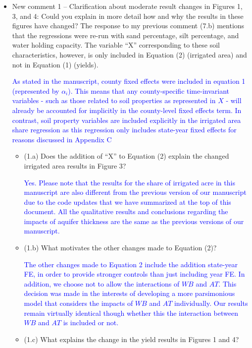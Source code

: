\documentclass[
]{article}
\begin{document}
\begin{itemize}
\item New comment 1 – Clarification about moderate result changes in Figures 1, 3, and 4: Could you explain in more detail how and why the results in these figures have changed? The response to my previous comment (7.b) mentions that the regressions were re-run with sand percentage, silt percentage, and water holding capacity. The variable ``X'' corresponding to these soil characteristics, however, is only included in Equation (2) (irrigated area) and not in Equation (1) (yields).

  \textcolor{blue}{As stated in the manuscript, county fixed effects were included in equation 1 (represented by $\alpha_i$). This means that any county-specific time-invariant variables - such as those related to soil properties as represented in $X$ - will already be accounted for implicitly in the county-level fixed effects term. In contrast, soil property variables are included explicitly in the irrigated area share regression as this regression only includes state-year fixed effects for reasons discussed in Appendix C}

  \begin{itemize}
  \item (1.a) Does the addition of ``X'' to Equation (2) explain the changed irrigated area results in Figure 3?

  \textcolor{blue}{Yes. Please note that the results for the share of irrigated acre in this manuscript are also different from the previous version of our manuscript  due to the code updates that we have summarized at the top of this document. All the qualitative results and conclusions regarding the impacts of aquifer thickness are the same as the previous versions of our manuscript.}
  
  \item (1.b) What motivates the other changes made to Equation (2)?

  \textcolor{blue}{The other changes made to Equation 2 include the addition state-year FE, in order to provide stronger controls than just including year FE. In addition, we choose not to allow the interactions of $WB$ and $AT$. This decision was made in the interests of developing a more parsimonious model that considers the impacts of $WB$ and $AT$ individually. Our results remain virtually identical though whether this the interaction between $WB$ and $AT$ is included or not. }
  
  \item (1.c) What explains the change in the yield results in Figures 1 and 4?


\end{itemize}
\end{itemize}
\end{document}
